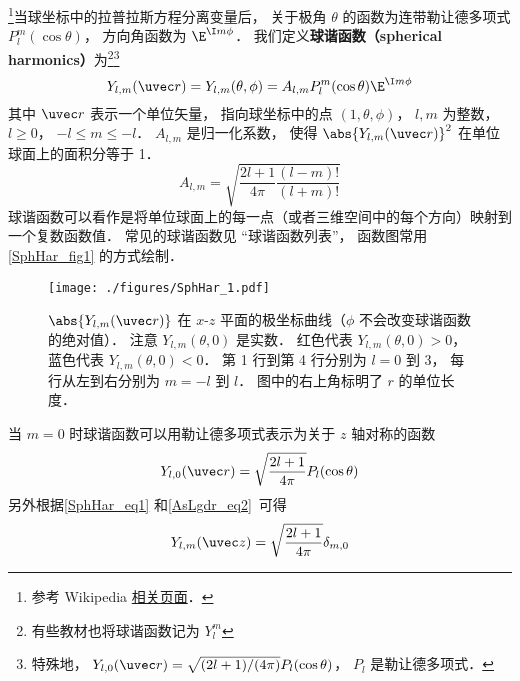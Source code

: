 

\footnote{参考 Wikipedia \href{https://en.wikipedia.org/wiki/Spherical_harmonics}{相关页面}．}当球坐标中的拉普拉斯方程分离变量后， 关于极角 $\theta$ 的函数为连带勒让德多项式 $P_l^m(\cos\theta)$， 方向角函数为 $\E^{\I m\phi}$． 我们定义\textbf{球谐函数（spherical harmonics）}为\footnote{有些教材也将球谐函数记为 $Y_l^m$}\footnote{特殊地， $Y_{l,0}(\uvec r) = \sqrt{(2l + 1)/(4\pi)}P_l(\cos\theta)$， $P_l$ 是勒让德多项式．}
\begin{equation}\label{SphHar_eq1}
Y_{l, m} (\uvec r) = Y_{l, m}(\theta, \phi) = A_{l,m} P_l^m(\cos \theta) \E^{\I m\phi}
\end{equation}
其中 $\uvec r$ 表示一个单位矢量， 指向球坐标中的点 $(1, \theta, \phi)$， $l, m$ 为整数， $l \geqslant 0$， $-l \leqslant m \leqslant -l$． $A_{l,m}$ 是归一化系数， 使得 $\abs{Y_{l, m} (\uvec r)}^2$ 在单位球面上的面积分等于 1．
\begin{equation}\label{SphHar_eq2}
A_{l,m} =  \sqrt{\frac{2l + 1}{4\pi }\frac{(l - m)!}{(l + m)!}}
\end{equation}
球谐函数可以看作是将单位球面上的每一点（或者三维空间中的每个方向）映射到一个复数函数值． 常见的球谐函数见 “球谐函数列表”， 函数图常用\autoref{SphHar_fig1} 的方式绘制．

\begin{figure}[ht]
\centering
\texttt{[image: ./figures/SphHar\_1.pdf]}
\caption{$\abs{Y_{l,m}(\uvec r)}$ 在 $x$-$z$ 平面的极坐标曲线（$\phi$ 不会改变球谐函数的绝对值）． 注意 $Y_{l,m}(\theta, 0)$ 是实数． 红色代表 $Y_{l,m}(\theta, 0) > 0$， 蓝色代表 $Y_{l,m}(\theta, 0) < 0$． 第 1 行到第 4 行分别为 $l = 0$ 到 $3$， 每行从左到右分别为 $m = -l$ 到 $l$． 图中的右上角标明了 $r$ 的单位长度．} \label{SphHar_fig1}
\end{figure}

当 $m = 0$ 时球谐函数可以用勒让德多项式表示为关于 $z$ 轴对称的函数
\begin{equation}\label{SphHar_eq11}
Y_{l,0}(\uvec r) = \sqrt{\frac{2l+1}{4\pi}} P_l(\cos\theta)
\end{equation}
另外根据\autoref{SphHar_eq1} 和\autoref{AsLgdr_eq2}~可得
\begin{equation}
Y_{l,m}(\uvec z) = \sqrt{\frac{2l+1}{4\pi}} \delta_{m,0}
\end{equation}

